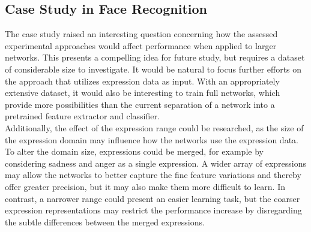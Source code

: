 \begin{comment}
- Performance and efficiency
- Prediction
- Generalize even more
- More metrics
- Show architecture
- Several input images
- More comparison
- Better presentation of visualizations
\end{comment}

\subsection{Case Study in Face Recognition}

The case study raised an interesting question concerning how the assessed experimental approaches would affect performance when applied to larger networks. This presents a compelling idea for future study, but requires a dataset of considerable size to investigate. It would be natural to focus further efforts on the approach that utilizes expression data as input. With an appropriately extensive dataset, it would also be interesting to train full networks, which provide more possibilities than the current separation of a network into a pretrained feature extractor and classifier. \\

\noindent Additionally, the effect of the expression range could be researched, as the size of the expression domain may influence how the networks use the expression data. To alter the domain size, expressions could be merged, for example by considering sadness and anger as a single expression. A wider array of expressions may allow the networks to better capture the fine feature variations and thereby offer greater precision, but it may also make them more difficult to learn. In contrast, a narrower range could present an easier learning task, but the coarser expression representations may restrict the performance increase by disregarding the subtle differences between the merged expressions.


\cleardoublepage